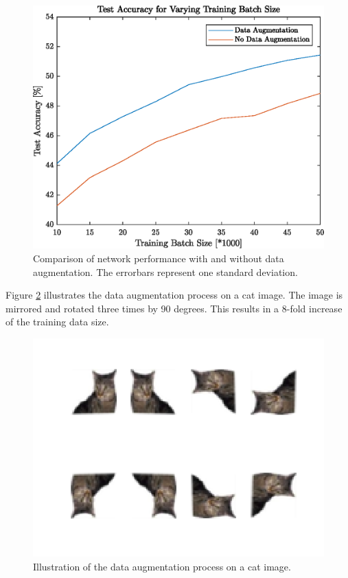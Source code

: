    	\begin{figure}[h!]
		\centering
   	  	\includegraphics{images/dataAugmentation}
   	  	\caption{Comparison of network performance with and without data augmentation. The errorbars represent one standard deviation.}
   	  	\label{fig:dataAugmentation}
   	\end{figure}
   	
Figure \ref{fig:dataAugDemo} illustrates the data augmentation process on a cat image. The image is mirrored and rotated three times by 90 degrees. This results in a 8-fold increase of the training data size.

   	\begin{figure}[h!]
   		\centering
   		\includegraphics{images/DataAugDemo.png}
   		\caption{Illustration of the data augmentation process on a cat image.}
   		\label{fig:dataAugDemo}
   	\end{figure}   	
   	
